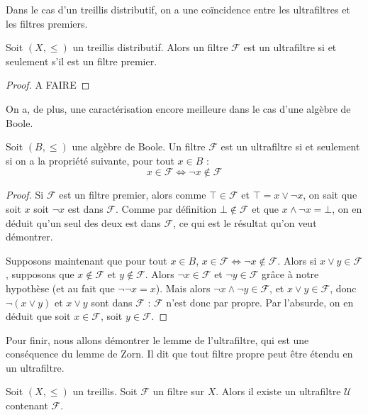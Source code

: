 Dans le cas d'un treillis distributif, on a une coïncidence entre les
ultrafiltres et les filtres premiers.

\begin{proposition}
  Soit $(X,\leq)$ un treillis distributif. Alors un filtre $\mathcal F$ est un
  ultrafiltre si et seulement s'il est un filtre premier.
\end{proposition}

\begin{proof}
  A FAIRE
\end{proof}

On a, de plus, une caractérisation encore meilleure dans le cas d'une algèbre de
Boole.

\begin{proposition}
  Soit $(B,\leq)$ une algèbre de Boole. Un filtre $\mathcal F$ est un ultrafiltre
  si et seulement si on a la propriété suivante, pour tout $x\in B$ :
  \[x\in \mathcal F \iff \lnot x \notin \mathcal F\]
\end{proposition}

\begin{proof}
  Si $\mathcal F$ est un filtre premier, alors comme $\top \in \mathcal F$ et
  $\top = x \lor \lnot x$, on sait que soit $x$ soit $\lnot x$ est dans
  $\mathcal F$. Comme par définition $\bot\notin\mathcal F$ et que
  $x\land\lnot x = \bot$, on en déduit qu'un seul des deux est dans $\mathcal F$,
  ce qui est le résultat qu'on veut démontrer.

  Supposons maintenant que pour tout $x\in B$,
  $x\in\mathcal F \iff \lnot x\notin \mathcal F$. Alors si
  $x\lor y\in \mathcal F$, supposons que $x\notin \mathcal F$ et
  $y\notin\mathcal F$. Alors $\lnot x \in \mathcal F$ et $\lnot y \in \mathcal F$
  grâce à notre hypothèse (et au fait que $\lnot\lnot x = x$). Mais alors
  $\lnot x \land \lnot y \in \mathcal F$, et $x\lor y \in \mathcal F$, donc
  $\lnot (x\lor y)$ et $x\lor y$ sont dans $\mathcal F$ : $\mathcal F$ n'est donc
  par propre. Par l'absurde, on en déduit que soit $x\in\mathcal F$, soit
  $y\in\mathcal F$.
\end{proof}

Pour finir, nous allons démontrer le lemme de l'ultrafiltre, qui est une
conséquence du lemme de Zorn. Il dit que tout filtre propre peut être étendu en
un ultrafiltre.

\begin{theorem}\label{thm.ultrafilter.lemma}
  Soit $(X,\leq)$ un treillis. Soit $\mathcal F$ un filtre sur $X$. Alors il
  existe un ultrafiltre $\mathcal U$ contenant $\mathcal F$.
\end{theorem}

